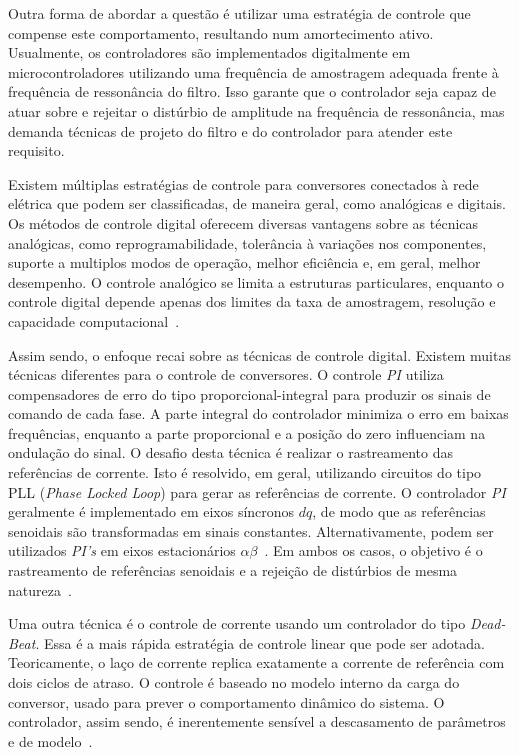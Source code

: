 	Outra forma de abordar a questão é utilizar uma estratégia de controle que
	compense este comportamento, resultando num amortecimento ativo. Usualmente,
	os controladores são implementados digitalmente em microcontroladores utilizando
	uma frequência de amostragem adequada frente à frequência de ressonância do
	filtro. Isso garante que o controlador seja capaz de atuar sobre e rejeitar
	o distúrbio de amplitude na frequência de ressonância, mas demanda técnicas
	de projeto do filtro e do controlador para atender este requisito.

	Existem múltiplas estratégias de controle para conversores conectados à
	rede elétrica que podem ser classificadas, de maneira geral, como analógicas
	e digitais. Os métodos de controle digital oferecem diversas vantagens sobre
	as técnicas analógicas, como reprogramabilidade, tolerância à variações
	nos componentes, suporte a multiplos modos de operação, melhor eficiência e,
	em geral, melhor desempenho. O controle analógico se limita a estruturas particulares,
	enquanto o controle digital depende apenas dos limites da taxa de amostragem,
	resolução e capacidade computacional~\cite{ref:KIMBALL}.

	Assim sendo, o enfoque recai sobre as técnicas de controle digital. Existem
	muitas técnicas diferentes para o controle de conversores. O controle \textit{PI}
	utiliza compensadores de erro do tipo proporcional-integral para produzir os
	sinais de comando de cada fase. A parte integral do controlador minimiza o
	erro em baixas frequências, enquanto a parte proporcional e a posição do zero
	influenciam na ondulação do sinal. O desafio desta técnica é realizar o
	rastreamento das referências de corrente. Isto é resolvido, em geral,
	utilizando circuitos do tipo PLL (\textit{Phase Locked Loop}) para gerar as
	referências de corrente. O controlador \textit{PI} geralmente é implementado
	em eixos síncronos $dq$, de modo que as	referências senoidais são transformadas
	em sinais constantes. Alternativamente, podem ser utilizados \textit{PI's} em
	eixos estacionários $\alpha \beta$~\cite{ref:KAZMIERKOWSKI}. Em ambos os casos,
	o objetivo é o rastreamento de referências senoidais e a rejeição de distúrbios
	de mesma natureza~\cite{ref:AREERAK}.


	Uma outra técnica é o controle de corrente usando um controlador do tipo
	\textit{Dead-Beat}. Essa é a mais rápida estratégia de controle linear que pode
	ser adotada. Teoricamente, o laço de corrente replica exatamente a corrente
	de referência com dois ciclos de atraso. O controle é baseado no modelo interno
	da carga do conversor, usado para prever o comportamento dinâmico do sistema. O
	controlador, assim sendo, é inerentemente sensível a descasamento de parâmetros
	e de modelo~\cite{ref:MALESANI}.

